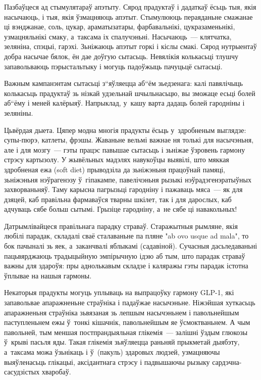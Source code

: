 Пазбаўцеся ад стымулятараў апэтыту. Сярод прадуктаў і дадаткаў ёсьць тыя, якія насычаюць, і тыя, якія ўзмацняюць апэтыт. Стымулююць пераяданьне смажанае ці вэнджанае, соль, цукар, араматызатары, фарбавальнікі, цукразаменьнікі, узмацняльнікі смаку, а~таксама іх спалучэньні. Насычаюць~--- клятчатка, зеляніна, спэцыі, гарэхі. Зьніжаюць апэтыт горкі і кіслы смакі. Сярод нутрыентаў добра насычае бялок, ён дае доўгую сытасьць. Невялікія колькасьці тлушчу запавольваюць пэрыстальтыку і могуць падоўжыць пачуцьцё сытасьці.

Важным кампанэнтам сытасьці з“яўляецца аб“ём зьедзенага: калі павялічыць колькасьць прадуктаў зь нізкай удзельнай шчыльнасьцю, вы зможаце есьці болей аб“ёму і меней калёрыяў. Напрыклад, у~кашу варта дадаць болей гародніны і зеляніны.

Цьвёрдая дыета. Цяпер модна многія прадукты ёсьць у~здробненым выглядзе: супы-пюрэ, катлеты, фрэшы. Жаваньне вельмі важнае ня толькі для насычэньня, але і для мозгу~--- гэты працэс павышае сытасьць і зьніжае ўзровень гармону стрэсу картызолу. У жывёльных мадэлях навукоўцы выявілі, што мяккая здробненая ежа (soft diet) прыводзіла да зьніжэньня працоўнай памяці, зьніжэньня нэўрагенэзу ў~гіпакампе, павелічэньня рызыкі нэўрадэгенэратыўных захворваньняў. Таму карысна пагрызьці гародніну і пажаваць мяса~--- як для дзяцей, каб правільна фармаваўся тварны шкілет, так і для дарослых, каб адчуваць сябе больш сытымі. Грызіце гародніну, а~не сябе ці навакольных!

Датрымлівайцеся правільнага парадку страваў. Старажытныя рымляне, якія любілі парадак, складалі сваё сталаваньне па пляне "ab ovo usque ad mala", то бок пачыналі зь яек, а~заканчвалі яблыкамі (садавіной). Сучасныя дасьледаваньні пацьвярджаюць традыцыйную эмпірычную ідэю аб тым, што парадак страваў важны для здароўя: пры аднолькавым складзе і каляражы гэты парадак істотна ўплывае на нашыя гармоны.

Некаторыя прадукты могуць уплываць на выпрацоўку гармону GLP-1, які запавольвае апаражненьне страўніка і падаўжае насычэньне. Ніжэйшая хуткасьць апаражненьня страўніка зьвязаная зь лепшым насычэньнем і павольнейшым паступленьнем ежы ў~тонкі кішачнік, павольнейшым яе ўсмоктваньнем. А чым павольней, тым меншая постпрандыяльная глікемія~--- залішні ўздым глюкозы ў~крыві пасьля яды. Такая глікемія зьяўляецца раньняй прыкметай дыябэту, а~таксама можа ўзьнікаць і ў~(пакуль) здаровых людзей, узмацняючы выяўленасьць глікацыі, аксідантнага стрэсу і падвышаючы рызыку сардэчна-сасудзістых хваробаў.

